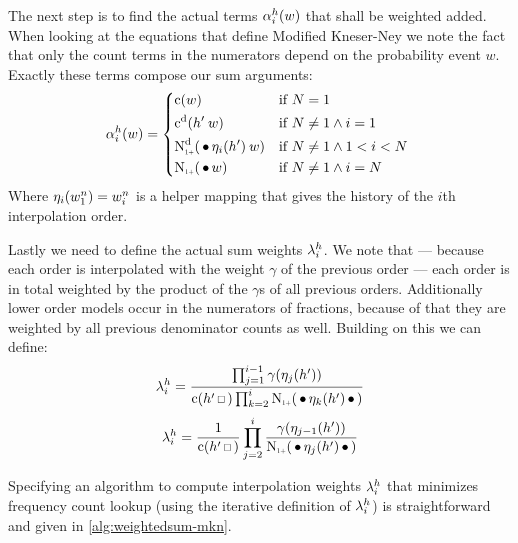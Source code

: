 The next step is to find the actual terms $\alpha_i^h(w)$ that shall be
weighted added.
When looking at the equations that define Modified Kneser-Ney we note the fact
that only the count terms in the numerators depend on the probability event $w$.
Exactly these terms compose our sum arguments:
\begin{equation}
  \SumArg_i^h(w) =
    \begin{dcases*}
      \Count(w)                                              & if $N = 1$ \\
      \DiscountedCount(\SeenHistory \: w)                    & if $N \neq 1 \land i = 1$ \\
      \DiscountedCount*(\WSkp \History_i(\SeenHistory) \: w) & if $N \neq 1 \land 1 < i < N$ \\
      \ContCountIp(\WSkp w)                                  & if $N \neq 1 \land i = N$
    \end{dcases*}
\end{equation}
Where $\eta_i(w_1^n) = w_i^n$ is a helper mapping that gives the history
of the $i$th interpolation order.

Lastly we need to define the actual sum weights $\lambda_i^h$.
We note that --- because each order is interpolated with the weight $\gamma$ of
the previous order --- each order is in total weighted by the product of the
$\gamma$s of all previous orders.
Additionally lower order models occur in the numerators of fractions, because of
that they are weighted by all previous denominator counts as well.
Building on this we can define:
\begin{equation}
  \SumWeight_i^h = \frac{\prod_{j = 1}^{i - 1} \gamma(\History_j(\SeenHistory))}
                        {\Count(\SeenHistory \Skp) \prod_{k = 2}^{i} \ContCountIp(\WSkp \History_k(\SeenHistory) \WSkp)}
\end{equation}
\begin{equation}
  \SumWeight_i^h = \frac{1}{\Count(\SeenHistory \Skp)} \prod_{j = 2}^i \frac{\gamma(\History_{j-1}(\SeenHistory))}{\ContCountIp(\WSkp \History_j(\SeenHistory) \WSkp)}
\end{equation}


Specifying an algorithm to compute interpolation weights $\lambda_i^h$ that
minimizes frequency count lookup (using the iterative definition of
$\lambda_i^h$) is straightforward and given in \cref{alg:weightedsum-mkn}.

